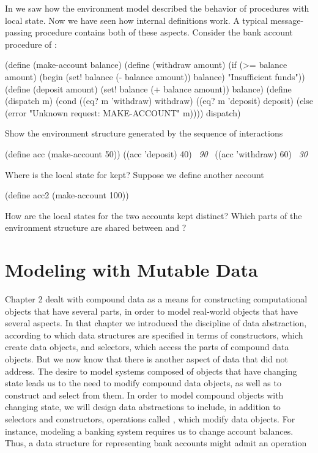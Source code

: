 \begin{exerciseGroup}
\label{Exercise 3.11}
 In  we saw how
the environment model described the behavior of procedures with local state.
Now we have seen how internal definitions work.  A typical message-passing
procedure contains both of these aspects.  Consider the bank account procedure
of :

\begin{codeBlock}
(define (make-account balance)
  (define (withdraw amount)
    (if (>= balance amount)
        (begin (set! balance (- balance amount))
               balance)
        "Insufficient funds"))
  (define (deposit amount)
    (set! balance (+ balance amount))
    balance)
  (define (dispatch m)
    (cond ((eq? m 'withdraw) withdraw)
          ((eq? m 'deposit) deposit)
          (else
           (error "Unknown request: MAKE-ACCOUNT"
                  m))))
  dispatch)
\end{codeBlock}

Show the environment structure generated by the sequence of interactions

\begin{codeBlock}
(define acc (make-account 50))
((acc 'deposit) 40)
~\textit{90}~
((acc 'withdraw) 60)
~\textit{30}~
\end{codeBlock}

Where is the local state for  kept?  Suppose we define another
account

\begin{codeBlock}
(define acc2 (make-account 100))
\end{codeBlock}

How are the local states for the two accounts kept distinct?  Which parts of
the environment structure are shared between  and ?
\end{exerciseGroup}

\section{Modeling with Mutable Data}
\label{Section 3.3}

Chapter 2 dealt with compound data as a means for constructing computational
objects that have several parts, in order to model real-world objects that have
several aspects.  In that chapter we introduced the discipline of data
abstraction, according to which data structures are specified in terms of
constructors, which create data objects, and selectors, which access the parts
of compound data objects.  But we now know that there is another aspect of data
that  did not address.  The desire to model systems composed of
objects that have changing state leads us to the need to modify compound data
objects, as well as to construct and select from them.  In order to model
compound objects with changing state, we will design data abstractions to
include, in addition to selectors and constructors, operations called
, which modify data objects.  For instance, modeling a
banking system requires us to change account balances.  Thus, a data structure
for representing bank accounts might admit an operation

